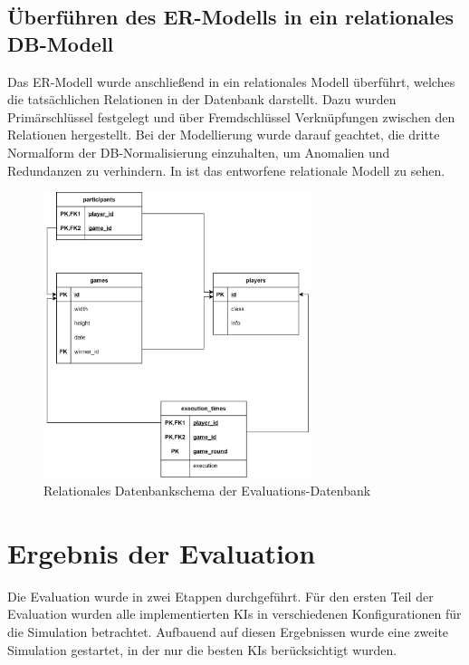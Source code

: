 \subsection{Überführen des \ac{ER}-Modells in ein relationales \acl{DB}-Modell}
\label{subsec:db-schema}

Das \ac{ER}-Modell wurde anschließend in ein relationales Modell überführt, welches die tatsächlichen Relationen in der
Datenbank darstellt.
Dazu wurden Primärschlüssel festgelegt und über Fremdschlüssel Verknüpfungen zwischen den Relationen hergestellt.
Bei der Modellierung wurde darauf geachtet, die dritte Normalform der \ac{DB}-Normalisierung einzuhalten,
um Anomalien und Redundanzen zu verhindern.
In  ist das entworfene relationale Modell zu sehen.

\begin{figure}[htb]
	\centering
	\includegraphics[width=0.7\textwidth]{Bilder/relationales_db_schema.png}
	\caption{Relationales Datenbankschema der Evaluations-Datenbank}
	\label{fig:relationales-db-schema}
\end{figure}

\section{Ergebnis der Evaluation}
\label{sec:ergebnis-evaluation}

Die Evaluation wurde in zwei Etappen durchgeführt.
Für den ersten Teil der Evaluation wurden alle implementierten \ac{KI}s in verschiedenen Konfigurationen für die Simulation betrachtet.
Aufbauend auf diesen Ergebnissen wurde eine zweite Simulation gestartet, in der nur die besten \ac{KI}s berücksichtigt
wurden.

